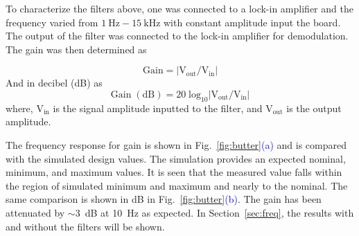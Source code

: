 To characterize the filters above, one was connected to a lock-in amplifier and the frequency varied from $\mathrm{1~Hz-15~kHz}$ with constant amplitude input the board. The output of the filter was connected to the lock-in amplifier for demodulation. The gain was then determined as 

\begin{equation}\label{eq:filter_gain}
    \mathrm{Gain=|V_{out}/V_{in}|}
\end{equation}
And in decibel (dB) as
\begin{equation}\label{eq:filter_gain_db}
    \mathrm{Gain\;(dB)=20\;log_{10}|V_{out}/V_{in}|}
\end{equation}
where, $\mathrm{V_{in}}$ is the signal amplitude inputted to the filter, and $\mathrm{V_{out}}$ is the output amplitude.


The frequency response for gain is shown in Fig.~\ref{fig:butter}\textcolor{blue}{(a)} and is compared with the simulated design values. The simulation provides an expected nominal, minimum, and maximum values. It is seen that the measured value falls within the region of simulated minimum and maximum and nearly to the nominal. The same comparison is shown in dB in Fig.~\ref{fig:butter}\textcolor{blue}{(b)}. The gain has been attenuated by $\sim3$~dB at 10~Hz as expected. In Section~\ref{sec:freq}, the results with and without the filters will be shown. 








